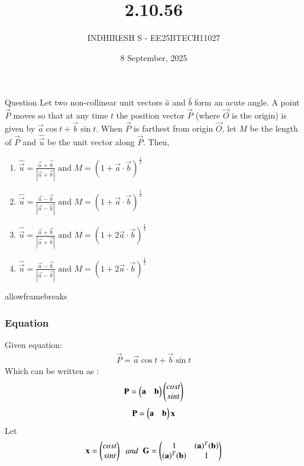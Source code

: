 \documentclass{beamer}
\title %
{2.10.56}
\date{8 September, 2025}
\author %
{INDHIRESH S - EE25BTECH11027}
\begin{document}
\frame{\titlepage}
\begin{frame}{Question}
Let two non-collinear unit vectors $\hat{a}$ and $\hat{b}$ form an acute angle. A point $\vec{P}$ moves so that at any time $t$ the position vector $\Vec{P}$ (where $\vec{O}$ is the origin) is given by $\Vec{a}\cos{t} + \vec{b}\sin{t}$. When $\vec{P}$ is farthest from origin $\vec{O}$, let $M$ be the length of $\Vec{P}$ and $\hat{\vec{u}}$ be the unit vector along $\Vec{P}$. Then,

    \begin{enumerate}
	    \item $\hat{\vec{u}} = \frac{\Vec{a}+\vec{b}}{|\Vec{a}+\vec{b}|} \text{ and } M = (1+\Vec{a} \cdot \vec{b})^{\frac{1}{2}}$
    	\item $\hat{\vec{u}} = \frac{\Vec{a}-\vec{b}}{|\Vec{a}-\vec{b}|} \text{ and } M = (1+\Vec{a} \cdot \vec{b})^{\frac{1}{2}}$
    	\item $\hat{\vec{u}} = \frac{\Vec{a}+\vec{b}}{|\Vec{a}+\vec{b}|} \text{ and } M = (1+2\Vec{a} \cdot \vec{b})^{\frac{1}{2}}$
    	\item $\hat{\vec{u}} = \frac{\Vec{a}-\vec{b}}{|\Vec{a}-\vec{b}|} \text{ and } M = (1+2\Vec{a} \cdot \vec{b})^{\frac{1}{2}}$
    \end{enumerate}
    
\end{frame}
\begin{frame}{allowframebreaks}
\frametitle{Equation}

    \centering
    
    \label{tab:parameters}
Given equation:
\begin{align}
     \Vec{P}=\vec{a}\cos{t} + \vec{b}\sin{t}
\end{align}
Which can be written as :
\begin{align}
    \Vec{P}=\myvec{\vec{a}&\vec{b}}\myvec{cost\\sint}
\end{align}
\begin{align}
    \Vec{P}=\myvec{\Vec{a}&\Vec{b}}\Vec{x}
\end{align}
Let
\begin{align}
    \Vec{x}= \myvec{cost \\ sint} \;\;and\;\;\vec{G}=\myvec{1&(\Vec{a})^T(\Vec{b})\\(\Vec{a})^T(\Vec{b})&1}
\end{align}

   
\end{frame}
\end{document}
